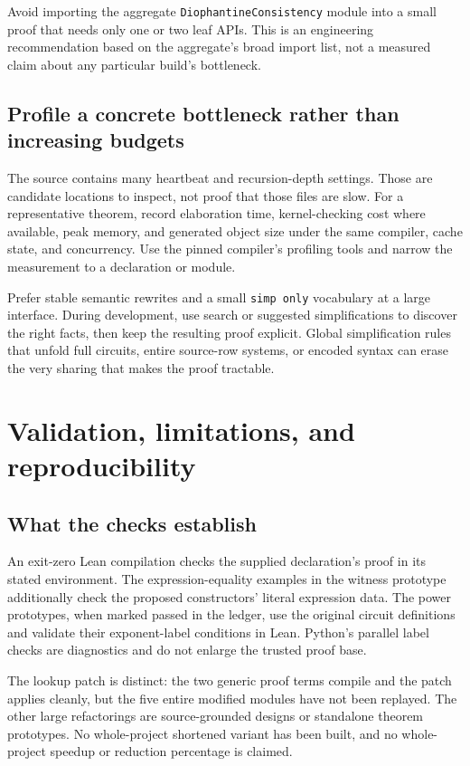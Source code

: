 \documentclass[11pt,letterpaper]{article}
\newcommand{\code}[1]{\nolinkurl{#1}}
\begin{document}
Avoid importing the aggregate \code{DiophantineConsistency} module into
a small proof that needs only one or two leaf APIs. This is an engineering
recommendation based on the aggregate's broad import list, not a measured
claim about any particular build's bottleneck.

\subsection{Profile a concrete bottleneck rather than increasing budgets}

The source contains many heartbeat and recursion-depth settings. Those
are candidate locations to inspect, not proof that those files are slow.
For a representative theorem, record elaboration time, kernel-checking
cost where available, peak memory, and generated object size under the
same compiler, cache state, and concurrency. Use the pinned compiler's
profiling tools and narrow the measurement to a declaration or module.

Prefer stable semantic rewrites and a small \code{simp only} vocabulary
at a large interface. During development, use search or suggested
simplifications to discover the right facts, then keep the resulting
proof explicit. Global simplification rules that unfold full circuits,
entire source-row systems, or encoded syntax can erase the very sharing
that makes the proof tractable.

\section{Validation, limitations, and reproducibility}



\subsection{What the checks establish}

An exit-zero Lean compilation checks the supplied declaration's proof
in its stated environment. The expression-equality examples in the
witness prototype additionally check the proposed constructors' literal
expression data. The power prototypes, when marked passed in the ledger,
use the original circuit definitions and validate their exponent-label
conditions in Lean. Python's parallel label checks are diagnostics and
do not enlarge the trusted proof base.

The lookup patch is distinct: the two generic proof terms compile and
the patch applies cleanly, but the five entire modified modules have
not been replayed. The other large refactorings are source-grounded
designs or standalone theorem prototypes. No whole-project shortened
variant has been built, and no whole-project speedup or reduction
percentage is claimed.
\end{document}
